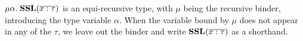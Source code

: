 $\mu\alpha.\; \textbf{SSL}(\overline{x : \tau})$ is an equi-recursive type, with $\mu$ being the recursive binder,
introducing the type variable $\alpha$. When
the variable bound by $\mu$ does not appear in any of the $\tau$, we leave out the binder and write $\textbf{SSL}(\overline{x : \tau})$
as a shorthand.




%
%
%
%
%
